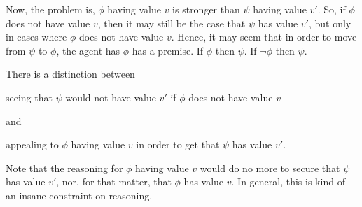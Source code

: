 \begin{note}
  Now, the problem is,
  \(\phi\) having value \(v\) is stronger than \(\psi\) having value \(v'\).
  So, if \(\phi\) does not have value \(v\), then it may still be the case that \(\psi\) has value \(v'\), but only in cases where \(\phi\) does not have value \(v\).
  Hence, it may seem that in order to move from \(\psi\) to \(\phi\), the agent has \(\phi\) has a premise.
  If \(\phi\) then \(\psi\).
  If \(\lnot\phi\) then \(\psi\).

  There is a distinction between

  seeing that \(\psi\) would not have value \(v'\) if \(\phi\) does not have value \(v\)

  and

  appealing to \(\phi\) having value \(v\) in order to get that \(\psi\) has value \(v'\).


  Note that the reasoning for \(\phi\) having value \(v\) would do no more to secure that \(\psi\) has value \(v'\), nor, for that matter, that \(\phi\) has value \(v\).
  In general, this is kind of an insane constraint on reasoning.
\end{note}




